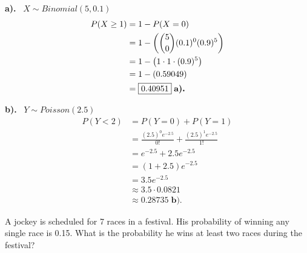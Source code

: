 \documentclass[a4paper, 10pt]{article}
\begin{document}
\begin{solution}
	\par\noindent\textbf{a).} \, \( X \sim Binomial(5, 0.1) \)
	\begin{align*}
		P(X \geq 1) & = 1 - P(X = 0)                             \\
		            & = 1 - \left(\binom{5}{0} (0.1)^0 (0.9)^5\right) \\
		            & = 1 - \left(1 \cdot 1 \cdot (0.9)^5\right)      \\
		            & = 1 - (0.59049)                            \\
		            & = \boxed{0.40951} \; \textbf{a).}
	\end{align*}

	\myspace

	\par\noindent\textbf{b).} \, \( Y \sim Poisson(2.5) \)
	\begin{align*}
		P(Y < 2) & = P(Y = 0) + P(Y = 1)                                       \\
		         & = \frac{(2.5)^0 e^{-2.5}}{0!} + \frac{(2.5)^1 e^{-2.5}}{1!} \\
		         & = e^{-2.5} + 2.5 e^{-2.5}                                   \\
		         & = (1 + 2.5) e^{-2.5}                                        \\
		         & = 3.5 e^{-2.5}                                              \\
		         & \approx 3.5 \cdot 0.0821                                    \\
		         & \approx \boxed{0.28735} \; \textbf{b).}
	\end{align*}
\end{solution}

\begin{problem}
A jockey is scheduled for 7 races in a festival. His probability of winning any single race is 0.15.
What is the probability he wins at least two races during the festival?
\end{problem}
\end{document}
